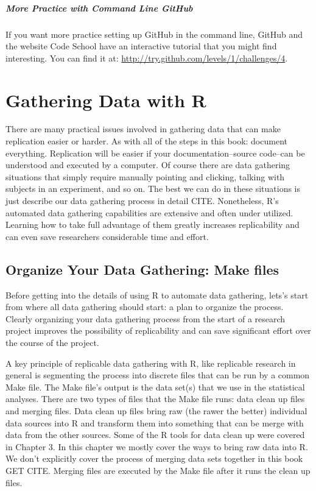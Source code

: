 \documentclass[ChapterTOCs,krantz1]{krantz}\usepackage{graphicx, color}
\begin{document}
{{\paragraph{More Practice with Command Line GitHub}

If you want more practice setting up GitHub in the command
line, GitHub and the website Code School have an interactive
tutorial that you might find interesting. You can find it at:
\url{http://try.github.com/levels/1/challenges/4}.




\chapter{Gathering Data with R}\label{DataGather}

There are many practical issues involved in gathering data that can make replication easier or harder. As with all of the steps in this book: document everything. Replication will be easier if your documentation--source code--can be understood and executed by a computer. Of course there are data gathering situations that simply require manually pointing and clicking, talking with subjects in an experiment, and so on. The best we can do in these situations is just describe our data gathering process in detail CITE. Nonetheless, R's automated data gathering capabilities are extensive and often under utilized. Learning how to take full advantage of them greatly increases replicability and can even save researchers considerable time and effort.

\section{Organize Your Data Gathering: Make files}

Before getting into the details of using R to automate data gathering, lets's start from where all data gathering should start: a plan to organize the process. Clearly organizing your data gathering process from the start of a research project improves the possibility of replicability and can save significant effort over the course of the project. 

A key principle of replicable data gathering with R, like replicable research in general is segmenting the process into discrete files that can be run by a common Make file. The Make file's output is the data set(s) that we use in the statistical analyses. There are two types of files that the Make file runs: data clean up files and merging files. Data clean up files bring raw (the rawer the better) individual data sources into R and transform them into something that can be merge with data from the other sources. Some of the R tools for data clean up were covered in Chapter 3. In this chapter we mostly cover the ways to bring raw data into R. We don't explicitly cover the process of merging data sets together in this book GET CITE. Merging files are executed by the Make file after it runs the clean up files.

}}
\end{document}

